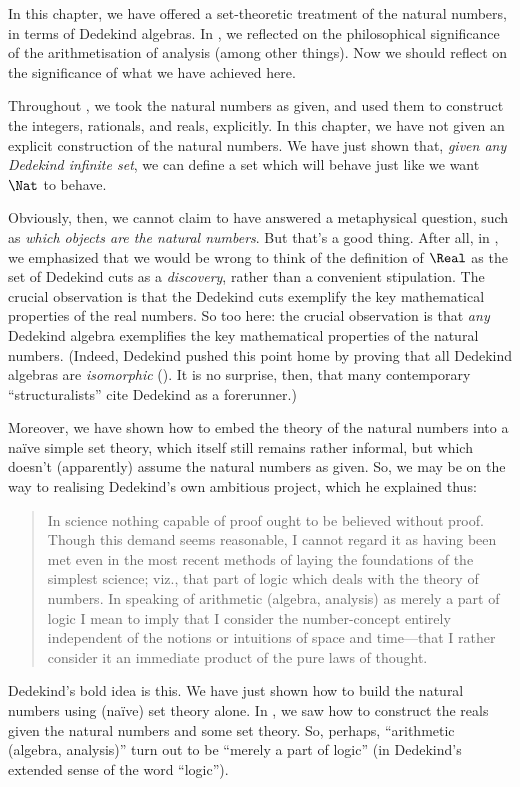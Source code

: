 \documentclass[../../../include/open-logic-section]{subfiles}
\begin{document}


In this chapter, we have offered a set-theoretic treatment of the
natural numbers, in terms of Dedekind algebras. In
, we reflected on the philosophical
significance of the arithmetisation of analysis (among other things).
Now we should reflect on the significance of what we have achieved
here.

Throughout , we took the natural numbers as
given, and used them to construct the integers, rationals, and reals,
explicitly. In this chapter, we have not given an explicit
construction of the natural numbers. We have just shown that,
\emph{given any Dedekind infinite set}, we can define a set which will
behave just like we want~$\Nat$ to behave. 

Obviously, then, we cannot claim to have answered a metaphysical
question, such as \emph{which objects are the natural numbers}. But
that's a good thing. After all, in  , we
emphasized that we would be wrong to think of the definition of
$\Real$ as the set of Dedekind cuts as a \emph{discovery}, rather than
a convenient stipulation. The crucial observation is that the Dedekind
cuts exemplify the key mathematical properties of the real
numbers. So too here: the crucial observation is that \emph{any}
Dedekind algebra exemplifies the key mathematical properties of the
natural numbers. (Indeed, Dedekind pushed this point home by proving
that all Dedekind algebras are \emph{isomorphic} (\citeyear[Theorems
132--3]{Dedekind1888}). It is no surprise, then, that many
contemporary ``structuralists'' cite Dedekind as a forerunner.)

 Moreover, we have shown how to embed the theory of the natural
 numbers into a na\"ive simple set theory, which itself still remains
 rather informal, but which doesn't (apparently) assume the natural
 numbers as given. So, we may be on the way to realising Dedekind's
 own ambitious project, which he explained thus:
\begin{quote}
	In science nothing capable of proof ought to be believed without
	proof. Though this demand seems reasonable, I cannot regard it as
	having been met even in the most recent methods of laying the
	foundations of the simplest science; viz., that part of logic
	which deals with the theory of numbers. In speaking of arithmetic
	(algebra, analysis) as merely a part of logic I mean to imply that
	I consider the number-concept entirely independent of the notions
	or intuitions of space and time---that I rather consider it an
	immediate product of the pure laws of thought.
	\citep[preface]{Dedekind1888}
\end{quote}
Dedekind's bold idea is this. We have just shown how to build the
natural numbers using (na\"ive) set theory alone. In
, we saw how to construct the reals given
the natural numbers and some set theory. So, perhaps, ``arithmetic
(algebra, analysis)'' turn out to be ``merely a part of logic'' (in
Dedekind's extended sense of the word ``logic'').
\end{document}
